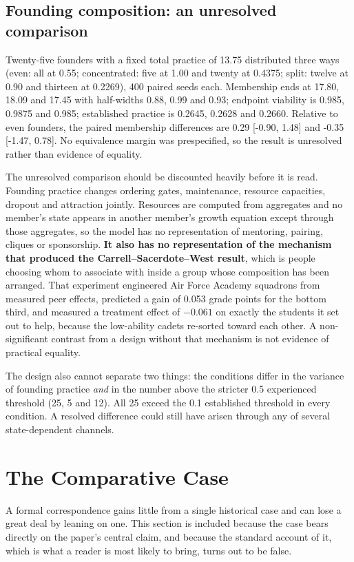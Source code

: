 \documentclass[11pt,a4paper]{article}
\begin{document}
\subsection{Founding composition: an unresolved comparison}

Twenty-five founders with a fixed total practice of 13.75 distributed three ways
(even: all at 0.55; concentrated: five at 1.00 and twenty at 0.4375; split: twelve
at 0.90 and thirteen at 0.2269), 400 paired seeds each. Membership ends at 17.80,
18.09 and 17.45 with half-widths 0.88, 0.99 and 0.93; endpoint viability is 0.985,
0.9875 and 0.985; established practice is 0.2645, 0.2628 and 0.2660. Relative to
even founders, the paired membership differences are 0.29 [-0.90, 1.48] and
-0.35 [-1.47, 0.78]. No equivalence margin was prespecified, so the result is
unresolved rather than evidence of equality.

The unresolved comparison should be discounted heavily before it is read. Founding
practice changes ordering gates, maintenance, resource capacities, dropout and
attraction jointly. Resources are computed from aggregates and no member's state
appears in another member's growth equation except through those aggregates, so the
model has no representation of mentoring, pairing, cliques or sponsorship.
\textbf{It also has no
representation of the mechanism that produced the Carrell--Sacerdote--West
result}, which is people choosing whom to associate with inside a group whose
composition has been arranged. That experiment engineered Air Force Academy
squadrons from measured peer effects, predicted a gain of 0.053 grade points for
the bottom third, and measured a treatment effect of $-0.061$ on exactly the
students it set out to help, because the low-ability cadets re-sorted toward each
other. A non-significant contrast from a design without that mechanism is not
evidence of practical equality.

The design also cannot separate two things: the conditions differ in the variance
of founding practice \emph{and} in the number above the stricter 0.5 experienced
threshold (25, 5 and 12). All 25 exceed the 0.1 established threshold in every
condition. A resolved difference could still have arisen through any of several
state-dependent channels.

\section{The Comparative Case}

A formal correspondence gains little from a single historical case and can lose a
great deal by leaning on one. This section is included because the case bears
directly on the paper's central claim, and because the standard account of it,
which is what a reader is most likely to bring, turns out to be false.
\end{document}
